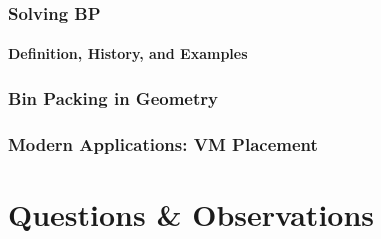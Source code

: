 \documentclass[10pt,    %
    english,            %
    xcolor=table,       %
    envcountsect,        %
    aspectratio=169     %
]{beamer}
\begin{document}
\begin{frame}
    \frametitle{Solving BP}
    \framesubtitle{Definition, History, and Examples}

\end{frame}

\begin{frame}
    \frametitle{Bin Packing in Geometry}

\end{frame}

\begin{frame}
    \frametitle{Modern Applications: VM Placement}

\end{frame}


\section{Questions \& Observations}
\sectionframe
\end{document}
